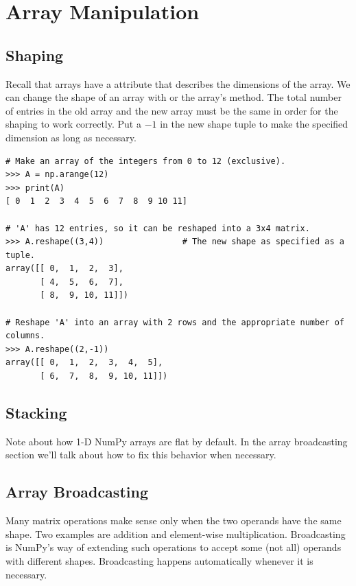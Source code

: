 \section*{Array Manipulation} %

\subsection*{Shaping} %

Recall that arrays have a  attribute that describes the dimensions of the array.
We can change the shape of an array with  or the array's  method.
The total number of entries in the old array and the new array must be the same in order for the shaping to work correctly.
Put a $-1$ in the new shape tuple to make the specified dimension as long as necessary.

\begin{lstlisting}
# Make an array of the integers from 0 to 12 (exclusive).
>>> A = np.arange(12)
>>> print(A)
[ 0  1  2  3  4  5  6  7  8  9 10 11]

# 'A' has 12 entries, so it can be reshaped into a 3x4 matrix.
>>> A.reshape((3,4))                # The new shape as specified as a tuple.
array([[ 0,  1,  2,  3],
       [ 4,  5,  6,  7],
       [ 8,  9, 10, 11]])

# Reshape 'A' into an array with 2 rows and the appropriate number of columns.
>>> A.reshape((2,-1))
array([[ 0,  1,  2,  3,  4,  5],
       [ 6,  7,  8,  9, 10, 11]])
\end{lstlisting}

\subsection*{Stacking}

\begin{info}
Note about how 1-D NumPy arrays are flat by default.
In the array broadcasting section we'll talk about how to fix this behavior when necessary.
\end{info}

\subsection*{Array Broadcasting} %

Many matrix operations make sense only when the two operands have the same shape. 
Two examples are addition and element-wise multiplication. 
Broadcasting is NumPy's way of extending such operations to accept some (not all) operands with different shapes. 
Broadcasting happens automatically whenever it is necessary. 

